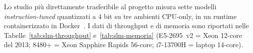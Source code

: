 Lo studio più direttamente trasferibile al progetto misura sette modelli \textit{instruction-tuned} quantizzati a 4 bit su tre ambienti CPU-only, in un runtime containerizzato in Docker~\cite{malakhov2026cpullm}. I dati di throughput e di memoria sono riportati nelle Tabelle~\ref{tab:slm-throughput} e~\ref{tab:slm-memoria} (E5-2695~v2 = Xeon 12-core del 2013; 8480+ = Xeon Sapphire Rapids 56-core; i7-13700H = laptop 14-core).

\begin{table}
	\centering
	\caption{Throughput (token/s), 4-bit GGUF su CPU~\cite{malakhov2026cpullm}.}
	\label{tab:slm-throughput}
	\small
\end{table}

